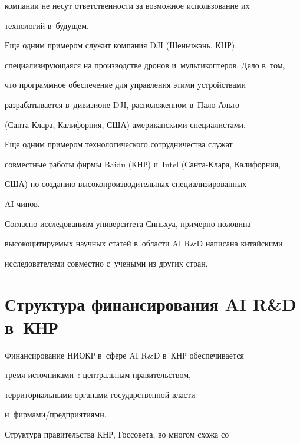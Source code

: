 компании не несут от\-вет\-ст\-вен\-ности за воз\-мож\-ное использование их 


технологий в~будущем.


     


     Еще одним примером служит компания DJI (Шеньчжэнь, КНР), 


специализирующаяся на производстве дронов и~мультикоптеров. Дело в~том, 


что программное обеспечение для управ\-ле\-ния этими устройствами 


разрабатывается в~дивизионе DJI, расположенном в~Пало-Аль\-то  


(Сан\-та-Кла\-ра, Калифорния, США) американскими специалистами.


     


     Еще одним примером технологического сотрудничества служат 


совместные работы фирмы Baidu (КНР) и~Intel (Сан\-та-Кла\-ра, Калифорния, 


США) по созданию высокопроизводительных специализированных 


 AI-чи\-пов.


     


     Согласно исследованиям университета Синьхуа, примерно половина 


высокоцитируемых научных статей в~области AI R\&D написана китайскими 


исследователями совместно с~учеными из других стран.


     


\section{Структура финансирования AI R\&D в~КНР}


     


     Финансирование НИОКР в~сфере AI R\&D в~КНР обеспечивается 


тремя источниками~\cite{9-b}: центральным правительством, 


территориальными органами государственной власти  


и~фир\-ма\-ми\!/\!пред\-при\-яти\-ями.


     


     Структура правительства КНР, Госсовета, во многом схожа со 


